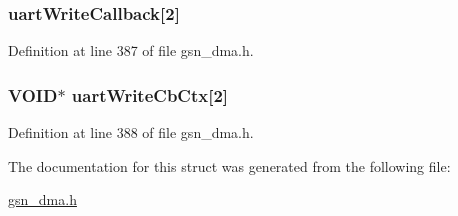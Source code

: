 \hypertarget{a00049_aa0d74b7ef433fb195c209bb0de4c8fae}{
\subsubsection[{uartWriteCallback}]{ {\bf uartWriteCallback}\mbox{[}2\mbox{]}}}
\label{a00049_aa0d74b7ef433fb195c209bb0de4c8fae}


Definition at line 387 of file gsn\_\-dma.h.

\hypertarget{a00049_afe05e53d420651ba7555e8db0398b772}{
\subsubsection[{uartWriteCbCtx}]{\setlength{\rightskip}{0pt plus 5cm}VOID$\ast$ {\bf uartWriteCbCtx}\mbox{[}2\mbox{]}}}
\label{a00049_afe05e53d420651ba7555e8db0398b772}


Definition at line 388 of file gsn\_\-dma.h.



The documentation for this struct was generated from the following file:\begin{DoxyCompactItemize}
\item 
\hyperlink{a00484}{gsn\_\-dma.h}\end{DoxyCompactItemize}
